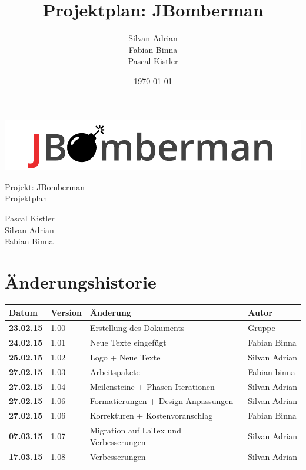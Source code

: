 \documentclass[11pt]{scrartcl}
\title{Projektplan: JBomberman}
\author{Silvan Adrian \\ Fabian Binna \\ Pascal Kistler}
\date{\today{}}
\begin{document}
\def\arraystretch{1.5}
\begin{titlepage}
\begin{center}
\vspace{10em}
\includegraphics[scale=2]{jbomberman}
\vspace{10em}
\end{center}
\begin{center}
\huge {Projekt: JBomberman} \\
\huge {Projektplan}
\end{center}
\begin{center}
\vspace{10em}
\LARGE {Pascal Kistler} \\
\LARGE {Silvan Adrian} \\
\LARGE {Fabian Binna}
\end{center}

\end{titlepage}

\newpage
\section{Änderungshistorie}
\label{sec:Änderungen}

\begin{tabularx}{\linewidth}{l l l l}
\textbf{Datum} & \textbf{Version} & \textbf{Änderung}  & \textbf{Autor} \\
\hline
\textbf{23.02.15} & 1.00 & Erstellung des Dokuments & Gruppe \\
\textbf{24.02.15} & 1.01 & Neue Texte eingefügt & Fabian Binna \\
\textbf{25.02.15} & 1.02 & Logo + Neue Texte & Silvan Adrian \\
\textbf{27.02.15} & 1.03 & Arbeitspakete & Fabian binna \\
\textbf{27.02.15} & 1.04 & Meilensteine + Phasen Iterationen & Silvan Adrian \\
\textbf{27.02.15} & 1.06 & Formatierungen + Design Anpassungen & Silvan Adrian \\
\textbf{27.02.15} & 1.06 & Korrekturen + Kostenvoranschlag & Fabian Binna \\
\textbf{07.03.15} & 1.07 & Migration auf LaTex und Verbesserungen & Silvan Adrian \\
\textbf{17.03.15} & 1.08 & Verbesserungen & Silvan Adrian
\end{tabularx}
\end{document}

